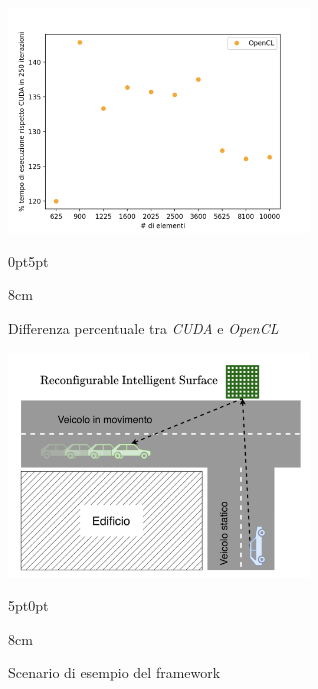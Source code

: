 \begin{figure}[!ht]
  \begin{minipage}[t]{0.5\linewidth}
    \centering
    \includegraphics[width=8cm]{images/results/gain-cuda-vs-opencl.png}
    \begin{adjustwidth}
      {0pt}{5pt}
      \begin{varwidth}
        {8cm}
        \caption{Differenza percentuale tra \textit{CUDA} e \textit{OpenCL}}
        \label{fig:risultati-cuda-opencl}
      \end{varwidth}
    \end{adjustwidth}
  \end{minipage}
  \begin{minipage}[t]{0.5\linewidth}
    \centering
    \includegraphics[width=8cm]{images/examples/framework-example.png}
    \begin{adjustwidth}
      {5pt}{0pt}
      \begin{varwidth}
        {8cm}
        \caption{Scenario di esempio del framework\cite{cooperis}}
        \label{fig:framework-scenario}
      \end{varwidth}
    \end{adjustwidth}
  \end{minipage}
\end{figure}

\vfill

